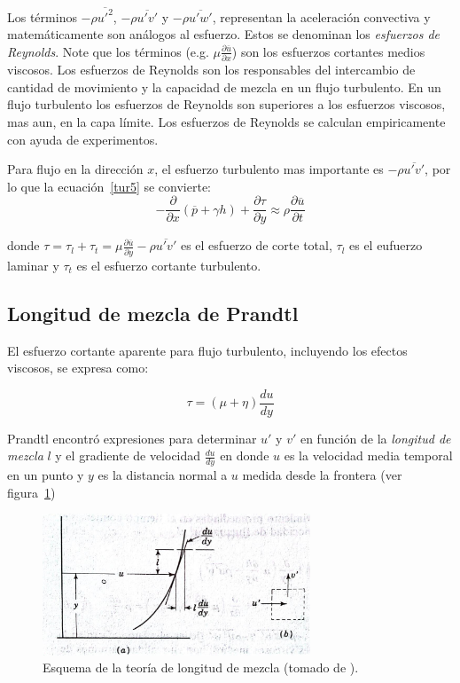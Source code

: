 \documentclass[11pt, oneside]{article}
\begin{document}
Los t\'erminos $-\rho \overline{{u'}^2}$, $-\rho \overline{u' v'}$ y $-\rho \overline{u' w'}$, representan la aceleraci\'on convectiva y matem\'aticamente son an\'alogos al esfuerzo. Estos se denominan los \emph{esfuerzos de Reynolds}. Note que los t\'erminos (e.g. $\mu\frac{\partial \overline{u}}{\partial x}$) son los esfuerzos cortantes medios viscosos. Los esfuerzos de Reynolds son los responsables del intercambio de cantidad de movimiento y la capacidad de mezcla en un flujo turbulento. En un flujo turbulento los esfuerzos de Reynolds son superiores a los esfuerzos viscosos, mas aun, en la capa l\'imite. Los esfuerzos de Reynolds se calculan empiricamente con ayuda de experimentos. 

Para flujo en la direcci\'on $x$, el esfuerzo turbulento mas importante es $-\rho \overline{u' v'}$, por lo que la ecuaci\'on~\ref{tur5} se convierte:
 \begin{equation}
-\frac{\partial}{\partial x}(\overline{p} + \gamma h) + \frac{\partial \tau}{\partial y} \approx \rho \frac{\partial \overline{u}}{\partial t}
\label{tur6}
\end{equation}

donde $\tau = \tau_l + \tau_t = \mu \frac{\partial \overline{u}}{\partial y} - \rho \overline{u' v'}$ es el esfuerzo de corte total, $\tau_l$ es el eufuerzo laminar y $\tau_t$ es el esfuerzo cortante turbulento. 

\subsection{Longitud de mezcla de Prandtl} %
El esfuerzo cortante aparente para flujo turbulento, incluyendo los efectos viscosos, se expresa como:

\begin{equation}
\tau = (\mu + \eta) \frac{du}{dy}
\label{tur60}
\end{equation}


Prandtl encontr\'o expresiones para determinar $u'$ y $v'$ en funci\'on de la \emph{longitud de mezcla} $l$ y el gradiente de velocidad $\frac{du}{dy}$ en donde $u$ es la velocidad media temporal en un punto y $y$ es la distancia normal a $u$ medida desde la frontera (ver figura~\ref{mez})

\begin{figure}[h]
\centering
\includegraphics[width=8cm]{mez.jpeg}
\caption{Esquema de la teor\'ia de longitud de mezcla (tomado de \cite{streeter}).}
\label{mez}
\end{figure}
\end{document}
